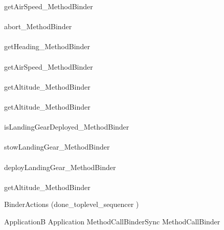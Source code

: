 \begin{circus}
	getAirSpeed\_MethodBinder
	\\ \interleave \\

	abort\_MethodBinder
	\\ \interleave \\

	getHeading\_MethodBinder
	\\ \interleave \\

	getAirSpeed\_MethodBinder
	\\ \interleave \\

	getAltitude\_MethodBinder
	\\ \interleave \\

	getAltitude\_MethodBinder
	\\ \interleave \\

	isLandingGearDeployed\_MethodBinder
	\\ \interleave \\

	stowLandingGear\_MethodBinder
	\\ \interleave \\

	deployLandingGear\_MethodBinder
	\\ \interleave \\

	getAltitude\_MethodBinder
	
\circblockclose
\end{circus}
%
\begin{circus}
\circspot BinderActions \circinterrupt (done\_toplevel\_sequencer \then \Skip)
\end{circus}
%
\begin{circus}
\circend
\end{circus}
%
\begin{circus}
\circprocess ApplicationB \circdef Application \lpar MethodCallBinderSync \rpar MethodCallBinder
\end{circus}
